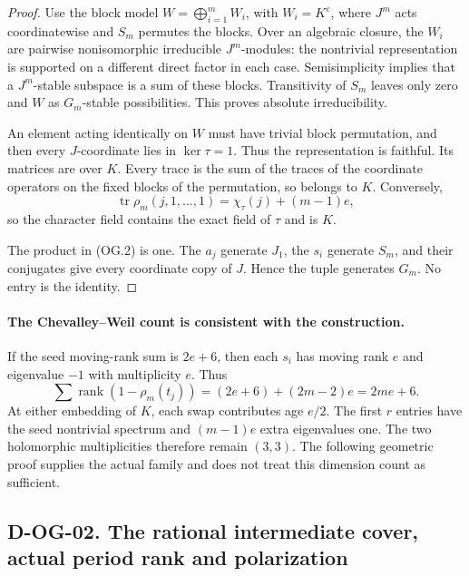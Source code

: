 \begin{proof}
Use the block model $W=\bigoplus_{i=1}^m W_i$, with $W_i=K^e$,
where $J^m$ acts coordinatewise and $S_m$ permutes the blocks.
Over an algebraic closure, the $W_i$ are pairwise nonisomorphic
irreducible $J^m$-modules: the nontrivial representation is supported
on a different direct factor in each case.  Semisimplicity implies
that a $J^m$-stable subspace is a sum of these blocks.  Transitivity
of $S_m$ leaves only zero and $W$ as $G_m$-stable possibilities.
This proves absolute irreducibility.

An element acting identically on $W$ must have trivial block
permutation, and then every $J$-coordinate lies in $\ker\tau=1$.
Thus the representation is faithful.  Its matrices are over $K$.
Every trace is the sum of the traces of the coordinate operators
on the fixed blocks of the permutation, so belongs to $K$.
Conversely,
\[
 \operatorname{tr}\rho_m(j,1,\ldots,1)
       =\chi_\tau(j)+(m-1)e,
 \tag{OG.3}
\]
so the character field contains the exact field of $\tau$ and is $K$.

The product in (OG.2) is one.  The $a_j$ generate $J_1$, the $s_i$
generate $S_m$, and their conjugates give every coordinate copy of
$J$.  Hence the tuple generates $G_m$.  No entry is the identity.
\end{proof}

\paragraph{The Chevalley--Weil count is consistent with the construction.}
If the seed moving-rank sum is $2e+6$, then each $s_i$ has moving
rank $e$ and eigenvalue $-1$ with multiplicity $e$.  Thus
\[
 \sum \operatorname{rank}(1-\rho_m(t_j))
       =(2e+6)+(2m-2)e=2me+6.
 \tag{OG.4}
\]
At either embedding of $K$, each swap contributes age $e/2$.
The first $r$ entries have the seed nontrivial spectrum and
$(m-1)e$ extra eigenvalues one.  The two holomorphic multiplicities
therefore remain $(3,3)$.  The following geometric proof supplies
the actual family and does not treat this dimension count as sufficient.

\subsection*{D-OG-02. The rational intermediate cover, actual period rank and polarization}

